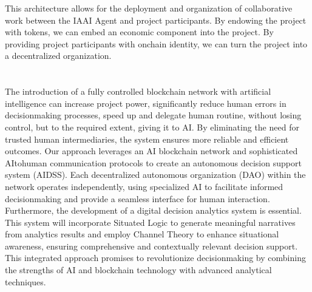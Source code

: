 \documentclass[a4paper,12pt,english]{sphinxmanual}
\begin{document}
\sphinxAtStartPar
This architecture allows for the deployment and organization of collaborative work between the IAAI Agent and project participants.
By endowing the project with tokens, we can embed an economic component into the project.
By providing project participants with onchain identity, we can turn the project into a decentralized organization.


\chapter{}
\label{\detokenize{index:conclusion}}
\sphinxAtStartPar
The introduction of a fully controlled blockchain network with
artificial intelligence can increase project power, significantly reduce
human errors in decision\sphinxhyphen{}making processes, speed up and delegate human
routine, without losing control, but to the required extent, giving it
to AI. By eliminating the need for trusted human intermediaries, the
system ensures more reliable and efficient outcomes. Our approach
leverages an AI blockchain network and sophisticated AI\sphinxhyphen{}to\sphinxhyphen{}human
communication protocols to create an autonomous decision support system
(AI\sphinxhyphen{}DSS). Each decentralized autonomous organization (DAO) within the
network operates independently, using specialized AI to facilitate
informed decision\sphinxhyphen{}making and provide a seamless interface for human
interaction. Furthermore, the development of a digital decision
analytics system is essential. This system will incorporate Situated
Logic to generate meaningful narratives from analytics results and
employ Channel Theory to enhance situational awareness, ensuring
comprehensive and contextually relevant decision support. This
integrated approach promises to revolutionize decision\sphinxhyphen{}making by
combining the strengths of AI and blockchain technology with advanced
analytical techniques.



\renewcommand{\indexname}{Index}
\printindex
\end{document}

